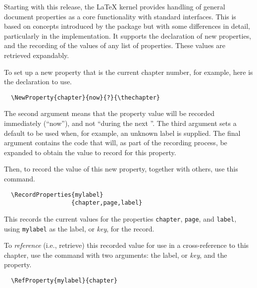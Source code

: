 \documentclass{ltnews}
\let\finalpagebreak\pagebreak %
\begin{document}
Starting with this release, the \LaTeX{} kernel provides handling of
general document properties as a core functionality with standard
interfaces.
%
This is based on concepts introduced by the  package but
with some differences in detail, particularly in the implementation.
It supports the declaration of new properties, and the recording of
the values of any list of properties. These values are retrieved
expandably.

To set up a new property that is the current chapter
number, for example, here is the declaration to use.
\begin{verbatim}
  \NewProperty{chapter}{now}{?}{\thechapter}
\end{verbatim}
\par\finalpagebreak\noindent
The second argument means that the property value will be recorded
immediately (\enquote{now}), and not \enquote{during the next
  }.  The third argument sets a default to be used when,
for example, an unknown label is supplied.
%
The final argument contains the code that will, as part of the
recording process, be expanded to obtain the value to record for this
property.

Then, to record the value of this new property,
together with others, use this command.
\begin{verbatim}
  \RecordProperties{mylabel}
                   {chapter,page,label}
\end{verbatim}
This records the current values for the properties \texttt{chapter},
\texttt{page}, and \texttt{label}, using \texttt{mylabel} as the
label, or \emph{key}, for the record.

To \emph{reference} (i.e., retrieve) this recorded value for use in a
cross-reference to this chapter, use the  command with
two arguments: the label, or \emph{key}, and the property.
\begin{verbatim}
  \RefProperty{mylabel}{chapter}
\end{verbatim}
\end{document}
